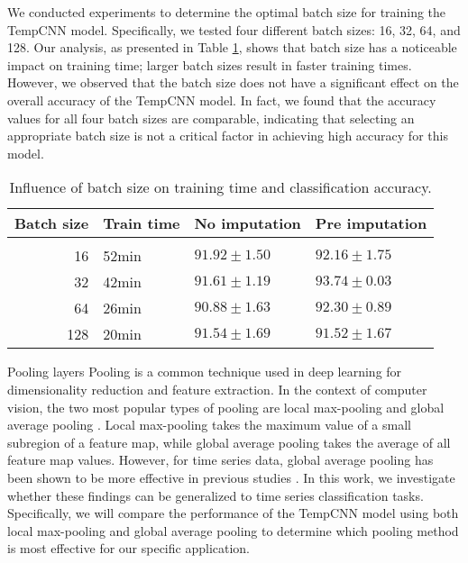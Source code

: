 We conducted experiments to determine the optimal batch size for training the TempCNN model.
Specifically, we tested four different batch sizes: 16, 32, 64, and 128.
Our analysis, as presented in Table \ref{tab:temCNNbatchsize}, shows that batch size has a noticeable impact on training time; larger batch sizes result in faster training times.
However, we observed that the batch size does not have a significant effect on the overall accuracy of the TempCNN model.
In fact, we found that the accuracy values for all four batch sizes are comparable, indicating that selecting an appropriate batch size is not a critical factor in achieving high accuracy for this model.

\begin{table}[H]
  \centering
   \begin{tabular}{rlll}
   Batch size                 & Train time  & No imputation         & Pre imputation             \\[0.2cm]
   \hline \\[-0.2cm]
    16        & 52min  	 & $91.92 \pm 1.50$ 	 & $92.16 \pm 1.75$\\
    32        & 42min  	 & $\mathbf{91.61 \pm 1.19}$ 	 & $\mathbf{93.74 \pm 0.03}$\\
    64        & 26min  	 & $90.88 \pm 1.63$ 	 & $92.30 \pm 0.89$\\
    128       & 20min  	 & $91.54 \pm 1.69$ 	 & $91.52 \pm 1.67$\\
   \end{tabular}
   \caption{Influence of batch size on training time and classification accuracy.}
   \label{tab:temCNNbatchsize}
 \end{table}
 
\begin{paragraph}{Pooling layers}
Pooling is a common technique used in deep learning for dimensionality reduction and feature extraction.
In the context of computer vision, the two most popular types of pooling are local max-pooling \cite{Ren2015Faster} and global average pooling \cite{He2016Deep}.
Local max-pooling takes the maximum value of a small subregion of a feature map, while global average pooling takes the average of all feature map values.
However, for time series data, global average pooling has been shown to be more effective in previous studies \cite{rs10020236,fawaz2018deep}.
In this work, we investigate whether these findings can be generalized to time series classification tasks. 
Specifically, we will compare the performance of the TempCNN model using both local max-pooling and global average pooling to determine which pooling method is most effective for our specific application.
\end{paragraph}

